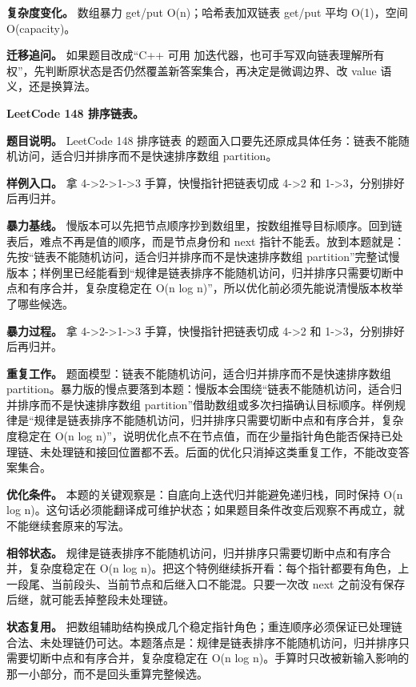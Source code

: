 \textbf{复杂度变化。} 数组暴力 get/put O(n)；哈希表加双链表 get/put 平均 O(1)，空间 O(capacity)。

\textbf{迁移追问。} 如果题目改成“C++ 可用  加迭代器，也可手写双向链表理解所有权”，先判断原状态是否仍然覆盖新答案集合，再决定是微调边界、改 value 语义，还是换算法。

\noindent\textbf{LeetCode 148 排序链表。}

\textbf{题目说明。} LeetCode 148 排序链表 的题面入口要先还原成具体任务：链表不能随机访问，适合归并排序而不是快速排序数组 partition。

\textbf{样例入口。} 拿 4->2->1->3 手算，快慢指针把链表切成 4->2 和 1->3，分别排好后再归并。

\textbf{暴力基线。} 慢版本可以先把节点顺序抄到数组里，按数组推导目标顺序。回到链表后，难点不再是值的顺序，而是节点身份和 next 指针不能丢。放到本题就是：先按“链表不能随机访问，适合归并排序而不是快速排序数组 partition”完整试慢版本；样例里已经能看到“规律是链表排序不能随机访问，归并排序只需要切断中点和有序合并，复杂度稳定在 O(n log n)”，所以优化前必须先能说清慢版本枚举了哪些候选。

\textbf{暴力过程。} 拿 4->2->1->3 手算，快慢指针把链表切成 4->2 和 1->3，分别排好后再归并。

\textbf{重复工作。} 题面模型：链表不能随机访问，适合归并排序而不是快速排序数组 partition。暴力版的慢点要落到本题：慢版本会围绕“链表不能随机访问，适合归并排序而不是快速排序数组 partition”借助数组或多次扫描确认目标顺序。样例规律是“规律是链表排序不能随机访问，归并排序只需要切断中点和有序合并，复杂度稳定在 O(n log n)”，说明优化点不在节点值，而在少量指针角色能否保持已处理链、未处理链和接回位置都不丢。后面的优化只消掉这类重复工作，不能改变答案集合。

\textbf{优化条件。} 本题的关键观察是：自底向上迭代归并能避免递归栈，同时保持 O(n log n)。这句话必须能翻译成可维护状态；如果题目条件改变后观察不再成立，就不能继续套原来的写法。

\textbf{相邻状态。} 规律是链表排序不能随机访问，归并排序只需要切断中点和有序合并，复杂度稳定在 O(n log n)。把这个特例继续拆开看：每个指针都要有角色，上一段尾、当前段头、当前节点和后继入口不能混。只要一次改 next 之前没有保存后继，就可能丢掉整段未处理链。

\textbf{状态复用。} 把数组辅助结构换成几个稳定指针角色；重连顺序必须保证已处理链合法、未处理链仍可达。本题落点是：规律是链表排序不能随机访问，归并排序只需要切断中点和有序合并，复杂度稳定在 O(n log n)。手算时只改被新输入影响的那一小部分，而不是回头重算完整候选。

